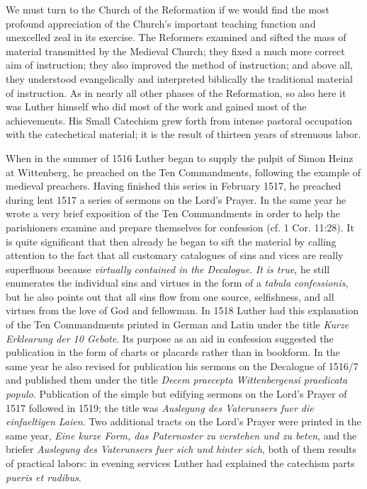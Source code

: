 We must turn to the Church of the Reformation if we would find the most profound appreciation of the Church’s important teaching function and unexcelled zeal in its exercise. The Reformers examined and sifted the mass of material transmitted by the Medieval Church; they fixed a much more correct aim of instruction; they also improved the method of instruction; and above all, they understood evangelically and interpreted biblically the traditional material of instruction. As in nearly all other phases of the Reformation, so also here it was Luther himself who did most of the work and gained most of the achievements. His Small Catechism grew forth from intense pastoral occupation with the catechetical material; it is the result of thirteen years of strenuous labor.

When in the summer of 1516 Luther began to supply the pulpit of Simon Heinz at Wittenberg, he preached on the Ten Commandments, following the example of medieval preachers. Having finished this series in February 1517, he preached during lent 1517 a series of sermons on the Lord’s Prayer. In the same year he wrote a very brief exposition of the Ten Commandments in order to help the parishioners examine and prepare themselves for confession (cf. 1 Cor. 11:28). It is quite significant that then already he began to sift the material by calling attention to the fact that all customary catalogues of sins and vices are really superfluous because \emph{virtually contained in the Decalogue}. \emph{It is true}, he still enumerates the individual sins and virtues in the form of a \emph{tabula confessionis}, but he also points out that all sins flow from one source, selfishness, and all virtues from the love of God and fellowman. In 1518 Luther had this explanation
of the Ten Commandments printed in German and Latin under the title \emph{Kurze Erklearung der 10 Gebote}. Its purpose as an aid in confession suggested the publication in the form of charts or placards rather than in bookform. In the same year he also revised for publication his sermons on the Decalogue of 1516/7 and published them under the title \emph{Decem praecepta Wittenbergensi praedicata populo}. Publication of the simple but edifying sermons on the Lord’s Prayer of 1517 followed in 1519; the title was \emph{Auslegung des Vaterunsers fuer die einfaeltigen Laien}. Two additional tracts on the Lord’s Prayer were printed in the same year, \emph{Eine kurze Form, das Paternoster zu verstehen und zu beten}, and the briefer \emph{Auslegung des Vaterunsers fuer sich und hinter sich}, both of them results of practical labors: in evening services Luther had explained the catechism parts \emph{pueris et rudibus}.

